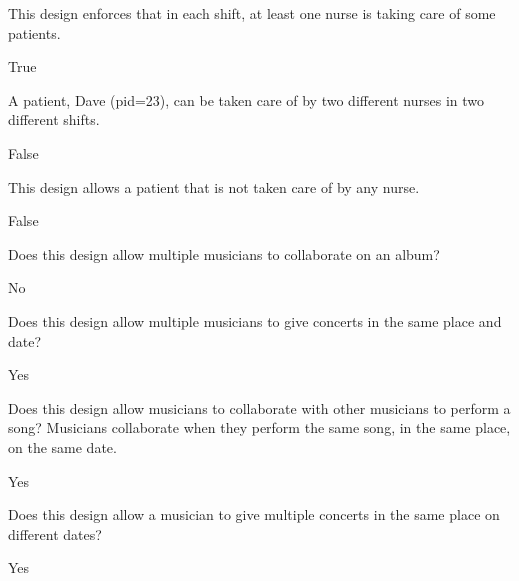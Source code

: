 \documentclass[12pt, letterpaper]{article}
\begin{document}
\begin{subproblem}{}
    This design enforces that in each shift, at least one nurse is taking care of some patients.
\end{subproblem}
\begin{solution}
    True
\end{solution}

\begin{subproblem}{}
    A patient, Dave (pid=23), can be taken care of by two different nurses in two different shifts.
\end{subproblem}
\begin{solution}
    False
\end{solution}

\begin{subproblem}{}
    This design allows a patient that is not taken care of by any nurse.
\end{subproblem}
\begin{solution}
    False
\end{solution}

\qh
\begin{subproblem}{}
    Does this design allow multiple musicians to collaborate on an album?
\end{subproblem}
\begin{solution}
    No
\end{solution}

\begin{subproblem}{}
    Does this design allow multiple musicians to give concerts in the same place and date?
\end{subproblem}
\begin{solution}
    Yes
\end{solution}

\begin{subproblem}{}
    Does this design allow musicians to collaborate with other musicians to perform a song?
Musicians collaborate when they perform the same song, in the same place, on the same
date.
\end{subproblem}
\begin{solution}
    Yes
\end{solution}

\begin{subproblem}{}
    Does this design allow a musician to give multiple concerts in the same place on different
dates?
\end{subproblem}
\begin{solution}
    Yes
\end{solution}
\end{document}
